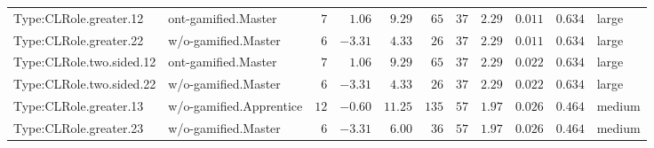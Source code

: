 \documentclass[6pt,a4paper]{article}
\begin{document}
{\begin{longtable}{llrrrrrrrrl}
Type:CLRole.greater.12&ont-gamified.Master&$ 7$&$ 1.06$&$ 9.29$&$ 65$&$ 37$&$2.29$&$0.011$&$0.634$&large\tabularnewline
Type:CLRole.greater.22&w/o-gamified.Master&$ 6$&$-3.31$&$ 4.33$&$ 26$&$ 37$&$2.29$&$0.011$&$0.634$&large\tabularnewline
Type:CLRole.two.sided.12&ont-gamified.Master&$ 7$&$ 1.06$&$ 9.29$&$ 65$&$ 37$&$2.29$&$0.022$&$0.634$&large\tabularnewline
Type:CLRole.two.sided.22&w/o-gamified.Master&$ 6$&$-3.31$&$ 4.33$&$ 26$&$ 37$&$2.29$&$0.022$&$0.634$&large\tabularnewline
Type:CLRole.greater.13&w/o-gamified.Apprentice&$12$&$-0.60$&$11.25$&$135$&$ 57$&$1.97$&$0.026$&$0.464$&medium\tabularnewline
Type:CLRole.greater.23&w/o-gamified.Master&$ 6$&$-3.31$&$ 6.00$&$ 36$&$ 57$&$1.97$&$0.026$&$0.464$&medium\tabularnewline
\hline
\end{longtable}}

\end{document}
